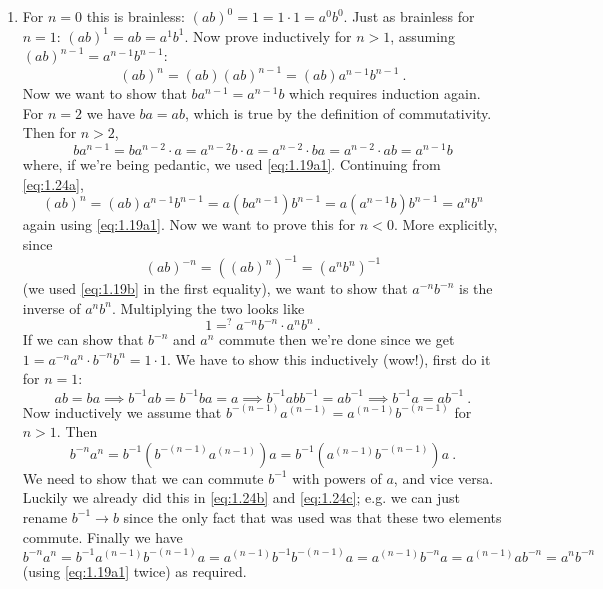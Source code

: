 \documentclass[]{article}
\begin{document}
\begin{enumerate}
\item For $n=0$ this is brainless: $(ab)^0 = 1 = 1\cdot 1 = a^0b^0$. Just as brainless for $n=1$: $(ab)^1 = ab = a^1b^1$. Now prove inductively for $n>1$, assuming $(ab)^{n-1} = a^{n-1}b^{n-1}$:
\begin{equation}
(ab)^n = (ab)(ab)^{n-1} = (ab)a^{n-1}b^{n-1}\ . \label{eq:1.24a}
\end{equation}
Now we want to show that $ba^{n-1} = a^{n-1}b$ which requires induction again. For $n=2$ we have $ba = ab$, which is true by the definition of commutativity. Then for $n>2$,
\begin{equation}
ba^{n-1} = ba^{n-2}\cdot a = a^{n-2}b\cdot a = a^{n-2}\cdot ba = a^{n-2} \cdot ab = a^{n-1}b \label{eq:1.24b}
\end{equation}
where, if we're being pedantic, we used \eqref{eq:1.19a1}. Continuing from \eqref{eq:1.24a},
\begin{equation}
(ab)^n = (ab)a^{n-1}b^{n-1} = a(ba^{n-1})b^{n-1} = a(a^{n-1}b)b^{n-1} = a^nb^n \label{eq:1.24c}
\end{equation}
again using \eqref{eq:1.19a1}.
Now we want to prove this for $n < 0$. More explicitly, since
\begin{equation}
(ab)^{-n} = \left((ab)^n\right)^{-1} = \left(a^nb^n\right)^{-1}
\end{equation}
(we used \eqref{eq:1.19b} in the first equality), we want to show that $a^{-n}b^{-n}$ is the inverse of $a^n b^n$. Multiplying the two looks like \begin{equation}
1 =^{?} a^{-n}b^{-n} \cdot a^n b^n\ .
\end{equation}
If we can show that $b^{-n}$ and $a^n$ commute then we're done since we get $1 = a^{-n}a^{n}\cdot b^{-n}b^n = 1\cdot 1$. We have to show this inductively (wow!), first do it for $n=1$:
\begin{equation}
ab = ba \implies b^{-1}ab = b^{-1}ba = a \implies b^{-1}abb^{-1} = ab^{-1} \implies b^{-1}a = ab^{-1}\ .
\end{equation}
Now inductively we assume that $b^{-(n-1)}a^{(n-1)} = a^{(n-1)}b^{-(n-1)}$ for $n>1$. Then
\begin{equation}
b^{-n}a^{n} = b^{-1}\left(b^{-(n-1)}a^{(n-1)} \right) a = b^{-1}\left( a^{(n-1)}b^{-(n-1)} \right) a\ .
\end{equation}
We need to show that we can commute $b^{-1}$ with powers of $a$, and vice versa. Luckily we already did this in \eqref{eq:1.24b} and \eqref{eq:1.24c}; e.g. we can just rename $b^{-1} \to b$ since the only fact that was used was that these two elements commute. Finally we have
\begin{equation}
b^{-n}a^{n} = b^{-1}a^{(n-1)}b^{-(n-1)}a = a^{(n-1)} b^{-1}b^{-(n-1)}a = a^{(n-1)} b^{-n}a = a^{(n-1)} a b^{-n} = a^nb^{-n}
\end{equation}
(using \eqref{eq:1.19a1} twice) as required.


\end{enumerate}
\end{document}

